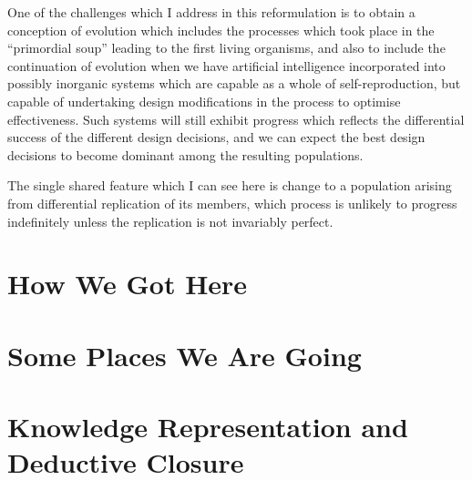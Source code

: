 \documentclass[10pt,titlepage]{article}
\begin{document}
One of the challenges which I address in this reformulation is to obtain a conception of evolution which includes the processes which took place in the ``primordial soup'' leading to the first living organisms, and also to include the continuation of evolution when we have artificial intelligence incorporated into possibly inorganic systems which are capable as a whole of self-reproduction, but capable of undertaking design modifications in the process to optimise effectiveness.
Such systems will still exhibit progress which reflects the differential success of the different design decisions, and we can expect the best design decisions to become dominant among the resulting populations.

The single shared feature which I can see here is change to a population arising from differential replication of its members, which process is unlikely to progress indefinitely unless the replication is not invariably perfect.

\section{How We Got Here}



\section{Some Places We Are Going}

\section{Knowledge Representation and Deductive Closure}

{}




\label{index}
{\twocolumn[]
{\small\printindex}}





\end{document}
